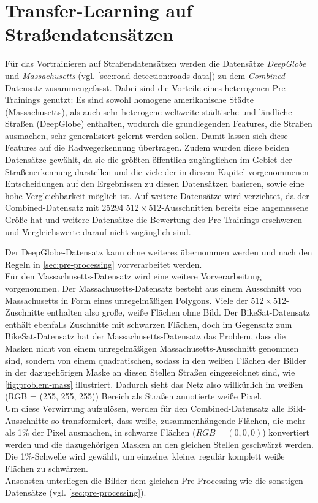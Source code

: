 \section{Transfer-Learning auf Straßendatensätzen} \label{sec:pre-training-roads}

Für das Vortrainieren auf Straßendatensätzen werden die Datensätze \textit{DeepGlobe} und \textit{Massachusetts} 
(vgl. \autoref{sec:road-detection:roads-data}) zu dem \textit{Combined}-Datensatz zusammengefasst. 
Dabei sind die Vorteile eines heterogenen Pre-Trainings genutzt: Es sind sowohl homogene amerikanische Städte (Massachusetts), 
als auch sehr heterogene weltweite städtische und ländliche Straßen (DeepGlobe) enthalten, wodurch 
die grundlegenden Features, die Straßen ausmachen, sehr generalisiert gelernt werden sollen. Damit lassen sich diese 
Features auf die Radwegerkennung übertragen. Zudem wurden diese beiden Datensätze gewählt, da sie die größten öffentlich zugänglichen 
im Gebiet der Straßenerkennung darstellen und die viele der in diesem Kapitel vorgenommenen Entscheidungen 
auf den Ergebnissen zu diesen Datensätzen basieren, sowie eine hohe Vergleichbarkeit möglich ist. 
Auf weitere Datensätze wird verzichtet, da der Combined-Datensatz mit 25294 $512{\times}512$-Ausschnitten 
bereits eine angemessene Größe hat und weitere Datensätze die Bewertung des Pre-Trainings erschweren und Vergleichswerte 
darauf nicht zugänglich sind. 

Der DeepGlobe-Datensatz kann ohne weiteres übernommen werden und nach den Regeln in \autoref{sec:pre-processing} vorverarbeitet werden. \\ 
Für den Massachusetts-Datensatz wird eine weitere Vorverarbeitung vorgenommen. Der Massachusetts-Datensatz 
besteht aus einem Ausschnitt von Massachusetts in Form eines unregelmäßigen Polygons. Viele der $512{\times}512$-Zuschnitte enthalten 
also große, weiße Flächen ohne Bild. Der BikeSat-Datensatz enthält ebenfalls Zuschnitte mit schwarzen Flächen, 
doch im Gegensatz zum BikeSat-Datensatz hat der Massachusetts-Datensatz das Problem, dass die Masken nicht von einem 
unregelmäßigen Massachusetts-Ausschnitt genommen sind, sondern von einem quadratischen, sodass in den weißen Flächen 
der Bilder in der dazugehörigen Maske an diesen Stellen Straßen eingezeichnet sind, wie \autoref{fig:problem-mass} illustriert. 
Dadurch sieht das Netz also willkürlich 
im weißen (RGB = (255, 255, 255)) Bereich als Straßen annotierte weiße Pixel. \\
Um diese Verwirrung aufzulösen, werden 
für den Combined-Datensatz alle Bild-Ausschnitte so transformiert, dass weiße, zusammenhängende Flächen, 
die mehr als 1\% der Pixel ausmachen, in schwarze Flächen ($RGB = (0,0,0)$) konvertiert werden und die dazugehörigen
Masken an den gleichen Stellen geschwärzt werden. Die 1\%-Schwelle wird gewählt, um einzelne, kleine, regulär komplett weiße 
Flächen zu schwärzen. \\
Ansonsten unterliegen die Bilder dem gleichen Pre-Processing wie die sonstigen Datensätze (vgl. \autoref{sec:pre-processing}). 

